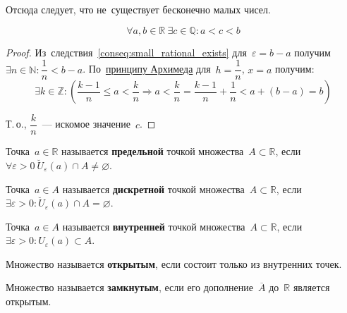 Отсюда следует, что не~существует бесконечно малых чисел.

\begin{consequent}
\begin{equation*}
\forall a, b \in \mathbb R \ \exists c \in \mathbb Q \colon a < c < b
\end{equation*}
\end{consequent}
\begin{proof}
Из~следствия~\ref{conseq:small_rational_exists} для~$\varepsilon = b - a$ получим $\exists n \in \mathbb N \colon \dfrac1n < b - a$.
По~\hyperlink{th:Archimedes'_principle}{принципу Архимеда} для~$h = \dfrac1n$, $x = a$ получим:
\begin{equation*}
\exists k \in \mathbb Z \colon \left( \frac{k - 1}n \leqslant a < \frac{k}n \Rightarrow
a < \frac{k}n = \frac{k - 1}n + \frac1n < a + (b - a) = b \right)
\end{equation*}

Т.\,о., $\dfrac{k}n$~--- искомое значение~$c$.
\end{proof}

\hypertarget{def:limit_point}{} Точка~$a \in \mathbb R$ называется \textbf{предельной} точкой множества~$A \subset \mathbb R$, если $\forall \varepsilon > 0 \ \breve U_\varepsilon(a) \cap A \neq \varnothing$.

\hypertarget{def:discrete_point}{} Точка~$a \in A$ называется \textbf{дискретной} точкой множества~$A \subset \mathbb R$, если $\exists \varepsilon > 0 \colon \breve U_\varepsilon(a) \cap A = \varnothing$.

\hypertarget{def:interior_point}{} Точка~$a \in A$ называется \textbf{внутренней} точкой множества~$A \subset \mathbb R$, если $\exists \varepsilon > 0 \colon U_\varepsilon(a) \subset A$.

Множество называется \textbf{открытым}, если состоит только из внутренних точек.

Множество называется \textbf{замкнутым}, если его дополнение~$\overline A$ до~$\mathbb R$ является открытым.

